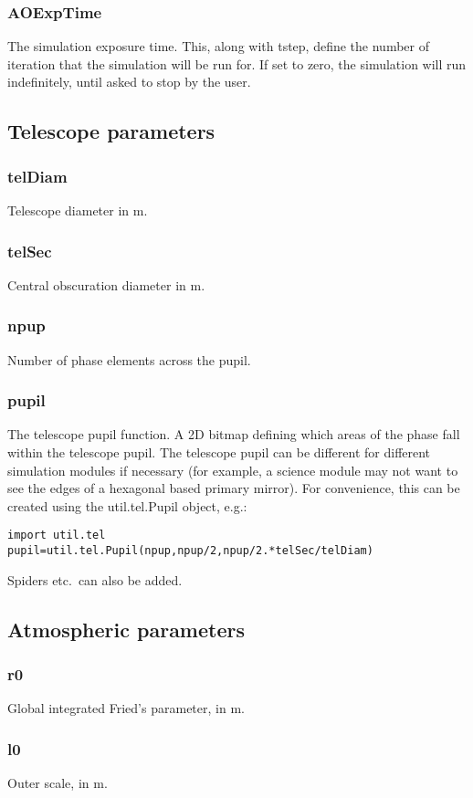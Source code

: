 \documentclass{article}
\begin{document}
\subsubsection{AOExpTime}
The simulation exposure time.  This, along with tstep, define the
number of iteration that the simulation will be run for.  If set to
zero, the simulation will run indefinitely, until asked to stop by the
user.  

\subsection{Telescope parameters}
\subsubsection{telDiam}
Telescope diameter in m.
\subsubsection{telSec}
Central obscuration diameter in m.
\subsubsection{npup}
Number of phase elements across the pupil.
\subsubsection{pupil}
The telescope pupil function.  A 2D bitmap defining which areas of the
phase fall within the telescope pupil.  The telescope pupil can be
different for different simulation modules if necessary (for example,
a science module may not want to see the edges of a hexagonal based
primary mirror).  For convenience, this can be created using the
util.tel.Pupil object, e.g.:
\begin{verbatim}
import util.tel
pupil=util.tel.Pupil(npup,npup/2,npup/2.*telSec/telDiam)
\end{verbatim}
Spiders etc.\ can also be added.

\subsection{Atmospheric parameters}
\subsubsection{r0}
Global integrated Fried's parameter, in m.  
\subsubsection{l0}
Outer scale, in m.
\end{document}
